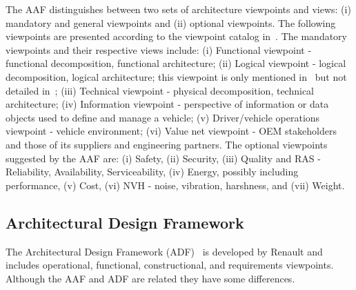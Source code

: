 The AAF distinguishes between two sets of architecture viewpoints and views: (i) mandatory and general viewpoints and (ii) optional viewpoints. The following viewpoints are presented according to the viewpoint catalog in~\cite{Rozanski2005}.
The mandatory viewpoints and their respective views include: (i)
%
Functional viewpoint - functional decomposition, functional
architecture;
(ii) Logical viewpoint - logical decomposition, logical architecture; this viewpoint is only mentioned in~\cite{Broy} but not detailed in~\cite{TUM-I0915};
(iii) Technical viewpoint - physical decomposition, technical architecture;
(iv) Information viewpoint - perspective of information or data objects used to
define and manage a vehicle;
(v) Driver/vehicle operations viewpoint - vehicle environment;
(vi) Value net viewpoint - OEM stakeholders and those of its suppliers and engineering partners. 
The optional viewpoints suggested by the AAF are:
(i) Safety, (ii) Security, (iii) Quality and RAS - Reliability, Availability, Serviceability, (iv) Energy, possibly including performance, (v) Cost, (vi) NVH - noise, vibration, harshness, and (vii) Weight.

\subsection{Architectural Design Framework}

The Architectural Design Framework (ADF)~\cite{AFRenault} is developed by Renault %
and 
includes operational, functional, constructional, and requirements viewpoints. Although
the AAF and ADF are related they have some differences. 

